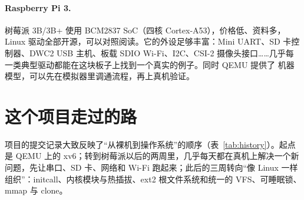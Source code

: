 \paragraph{Raspberry Pi 3.} 树莓派 3B/3B+ 使用 BCM2837 SoC（四核 Cortex-A53），价格低、资料多，Linux 驱动全部开源，可以对照阅读。它的外设足够丰富：Mini UART、SD 卡控制器、DWC2 USB 主机、板载 SDIO Wi-Fi、I2C、CSI-2 摄像头接口……几乎每一类典型驱动都能在这块板子上找到一个真实的例子。同时 QEMU 提供了  机器模型，可以先在模拟器里调通流程，再上真机验证。

\section{这个项目走过的路}

项目的提交记录大致反映了“从裸机到操作系统”的顺序（表~\ref{tab:history}）。起点是 QEMU  上的 xv6；转到树莓派以后的两周里，几乎每天都在真机上解决一个新问题，先让串口、SD 卡、网络和 Wi-Fi 跑起来；此后的三周转向“像 Linux 一样组织”：initcall、内核模块与热插拔、ext2 根文件系统和统一的 VFS、可睡眠锁、mmap 与 clone。


